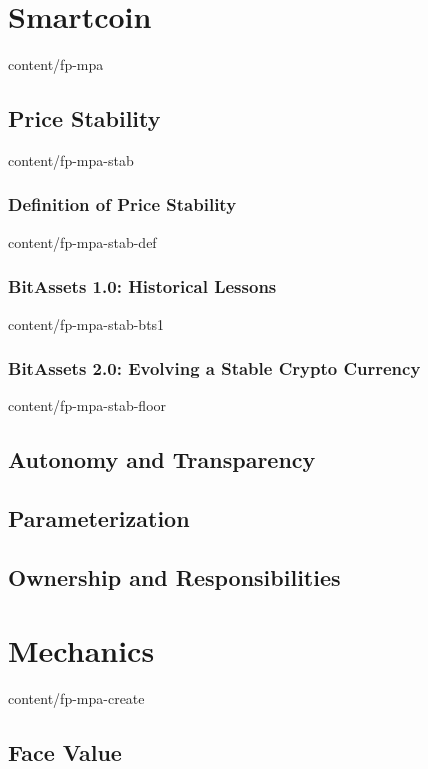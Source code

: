 \documentclass{btswhitepaper}
\begin{document}
\section       { Smartcoin                                        }  { content/fp-mpa                    } 
\subsection    { Price Stability                                  }  { content/fp-mpa-stab               } 
\subsubsection { Definition of Price Stability                    }  { content/fp-mpa-stab-def           } 
\subsubsection { BitAssets 1.0: Historical Lessons                }  { content/fp-mpa-stab-bts1          } 
\subsubsection { BitAssets 2.0: Evolving a Stable Crypto Currency }  { content/fp-mpa-stab-floor         } 
\subsection    { Autonomy and Transparency                        } 
\subsection    { Parameterization                                 } 
\subsection    { Ownership and Responsibilities                   }

\section       { Mechanics                                        }  { content/fp-mpa-create             } 
\subsection    { Face Value                                       } 
\end{document}
